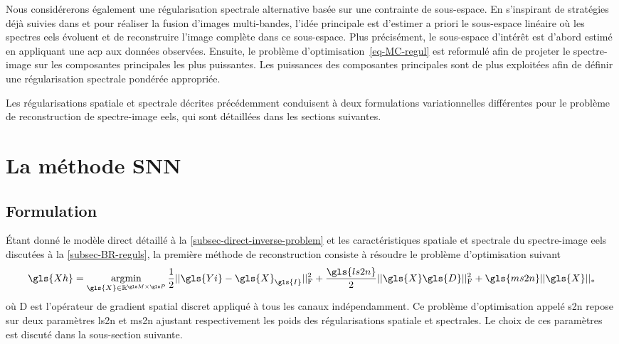 Nous considérerons également une régularisation spectrale alternative basée sur une contrainte de sous-espace. En s'inspirant de stratégies déjà suivies dans \cite{wei2015bayesian} et \cite{wei2015fast} pour réaliser la fusion d'images multi-bandes, l'idée principale est d'estimer a priori le sous-espace linéaire où les spectres \gls{eels} évoluent et de reconstruire l'image complète dans ce sous-espace. Plus précisément, le sous-espace d'intérêt est d'abord estimé en appliquant une \gls{acp} aux données observées. Ensuite, le problème d'optimisation~\eqref{eq-MC-regul} est reformulé afin de projeter le spectre-image sur les composantes principales les plus puissantes. Les puissances des composantes principales sont de plus exploitées afin de définir une régularisation spectrale pondérée appropriée.

Les régularisations spatiale et spectrale décrites précédemment conduisent à deux formulations variationnelles différentes pour le problème de reconstruction de spectre-image \gls{eels}, qui sont détaillées dans les sections suivantes.

%
\section{La méthode SNN}

\subsection{Formulation}\label{s2n-formulation}

\'Etant donné le modèle direct détaillé à la \cref{subsec-direct-inverse-problem} et les caractéristiques spatiale et spectrale du spectre-image \gls{eels} discutées à la \cref{subsec-BR-reguls}, la première méthode de reconstruction consiste à résoudre le problème d'optimisation suivant
\begin{equation}\label{eq-s2n}
    \gls{Xh} = \argmin_{\gls{X}\in\mathbb{R}^{\taille{M}{P}}} %
    \frac{1}{2} \frobnorm{\gls{Yi} - \gls{X}_{\gls{I}}}  +
    \frac{\gls{ls2n}}{2} \frobnorm{\gls{X}\gls{D}} + 
    \gls{ms2n} ||\gls{X}||_*
\end{equation}
où \gls{D} est l'opérateur de gradient spatial discret appliqué à tous les canaux indépendamment. Ce problème d'optimisation appelé \gls{s2n} repose sur deux paramètres \gls{ls2n} et \gls{ms2n} ajustant respectivement les poids des régularisations spatiale et spectrales. Le choix de ces paramètres est discuté dans la sous-section suivante.


